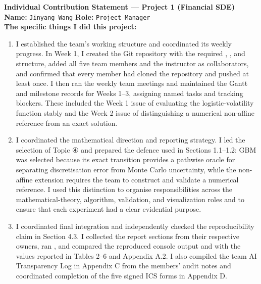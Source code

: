 \documentclass[11pt,a4paper]{article}
\theoremstyle{definition}
\theoremstyle{remark}
\begin{document}
\begin{formbox}
\textbf{Individual Contribution Statement --- Project 1 (Financial SDE)}\\[0.4em]

\textbf{Name:} \texttt{Jinyang Wang}
\hfill
\textbf{Role:} \texttt{Project Manager}\\[0.4em]

\textbf{The specific things I did this project:}

\begin{enumerate}[leftmargin=2em]

\item I established the team's working structure and coordinated its weekly
progress. In Week 1, I created the Git repository with the required
, , and  structure, added all five
team members and the instructor as collaborators, and confirmed that every
member had cloned the repository and pushed at least once. I then ran the
weekly team meetings and maintained the Gantt and milestone records for
Weeks 1--3, assigning named tasks and tracking blockers. These included the
Week 1 issue of evaluating the logistic-volatility function stably and the
Week 2 issue of distinguishing a numerical non-affine reference from an
exact solution.

\item I coordinated the mathematical direction and reporting strategy. I led
the selection of Topic ④ and prepared the defence used in Sections 1.1--1.2:
GBM was selected because its exact transition provides a pathwise oracle for
separating discretisation error from Monte Carlo uncertainty, while the
non-affine extension requires the team to construct and validate a numerical
reference. I used this distinction to organise responsibilities across the
mathematical-theory, algorithm, validation, and visualization roles and to
ensure that each experiment had a clear evidential purpose.

\item I coordinated final integration and independently checked the
reproducibility claim in Section 4.3. I collected the report sections from
their respective owners, ran
, and compared the reproduced console
output and  with the values reported in
Tables 2--6 and Appendix A.2. I also compiled the team AI Transparency Log in
Appendix C from the members' audit notes and coordinated completion of the
five signed ICS forms in Appendix D.


\end{enumerate}
\end{formbox}
\end{document}
